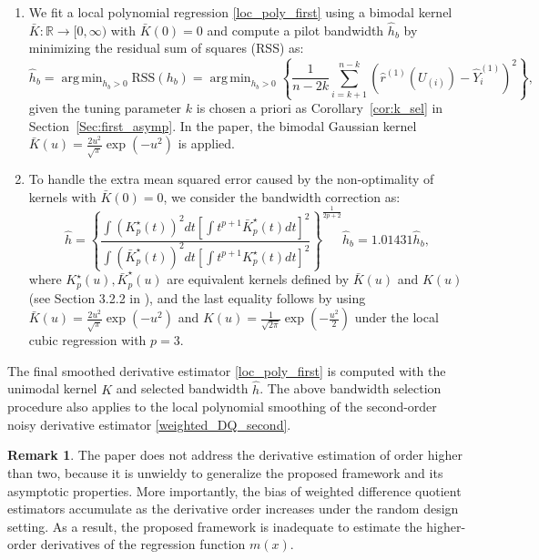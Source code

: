 \documentclass{uwstat572}
\theoremstyle{definition}
\newtheorem{Remark}{Remark}
\DeclareMathOperator*{\argmin}{arg\,min}
\renewcommand{\hat}{\widehat}
\theoremstyle{theorem}
\begin{document}
\begin{enumerate}
	\item We fit a local polynomial regression \eqref{loc_poly_first} using a bimodal kernel $\bar{K}:\mathbb{R}\to [0,\infty)$ with $\bar{K}(0)=0$ and compute a pilot bandwidth $\hat{h}_b$ by minimizing the residual sum of squares (RSS) as:
	\begin{equation}
		\label{band_loc_pol}
		\hat{h}_b = \argmin_{h_b>0} \mathrm{RSS}(h_b) = \argmin_{h_b>0} \left\{\frac{1}{n-2k} \sum_{i=k+1}^{n-k} \left(\hat{r}^{(1)}(U_{(i)}) -\hat{Y}_i^{(1)} \right)^2 \right\},
	\end{equation} 
	given the tuning parameter $k$ is chosen a priori as Corollary~\ref{cor:k_sel} in Section~\ref{Sec:first_asymp}. In the paper, the bimodal Gaussian kernel $\bar{K}(u)=\frac{2u^2}{\sqrt{\pi}} \exp(-u^2)$ is applied.
	
	\item To handle the extra mean squared error caused by the non-optimality of kernels with $\bar{K}(0)=0$, we consider the bandwidth correction as:
	$$\hat{h} = \left\{\frac{\int \left(K_p^{\star}(t)\right)^2 dt \left[\int t^{p+1}\bar{K}_p^{\star}(t) dt \right]^2}{\int \left(\bar{K}_p^{\star}(t)\right)^2 dt \left[\int t^{p+1}K_p^{\star}(t) dt \right]^2}\right\}^{\frac{1}{2p+2}} \hat{h}_b = 1.01431 \hat{h}_b,$$
	where $K_p^{\star}(u), \bar{K}_p^{\star}(u)$ are equivalent kernels defined by $\bar{K}(u)$ and $K(u)$ (see Section 3.2.2 in \citealt{fan1996local}), and the last equality follows by using $\bar{K}(u)=\frac{2u^2}{\sqrt{\pi}} \exp(-u^2)$ and $K(u)=\frac{1}{\sqrt{2\pi}} \exp\left(-\frac{u^2}{2}\right)$ under the local cubic regression with $p=3$.  
\end{enumerate}
The final smoothed derivative estimator \eqref{loc_poly_first} is computed with the unimodal kernel $K$ and selected bandwidth $\hat{h}$. The above bandwidth selection procedure also applies to the local polynomial smoothing of the second-order noisy derivative estimator \eqref{weighted_DQ_second}.

\begin{Remark}
The paper does not address the derivative estimation of order higher than two, because it is unwieldy to generalize the proposed framework and its asymptotic properties. More importantly, the bias of weighted difference quotient estimators accumulate as the derivative order increases under the random design setting. As a result, the proposed framework is inadequate to estimate the higher-order derivatives of the regression function $m(x)$.
\end{Remark}
\end{document}
